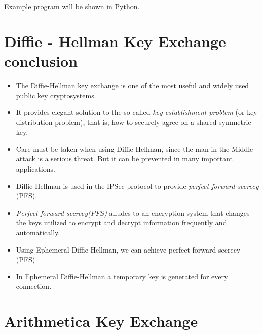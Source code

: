 \documentclass[12pt]{article}
\begin{document}
      \text Example program will be shown in Python. 
      
       \chapter{Diffie - Hellman Key Exchange conclusion}
       \begin{itemize}
       \item  The Diffie-Hellman key exchange is one of the most useful and widely used public key cryptosystems.\\
       \item It provides elegant solution to the so-called \textit{key establishment problem} (or key distribution problem), that is, how to securely agree on a shared symmetric key.\\
       \item  Care must be taken when using Diffie-Hellman, since the man-in-the-Middle attack is a serious threat. But it can be prevented in many important applications.\\
       \item Diffie-Hellman is used in the IPSec protocol to provide \textit{perfect forward secrecy} (PFS).\\
    
           \item \textit{Perfect forward secrecy(PFS)} alludes to an encryption system that changes the keys utilized to encrypt and decrypt information frequently and automatically.
           \item Using Ephemeral Diffie-Hellman, we can achieve perfect forward secrecy (PFS)
           \item In Ephemeral Diffie-Hellman a temporary key is generated for every connection.
       \end{itemize}
       \chapter{Arithmetica Key Exchange}
\end{document}
